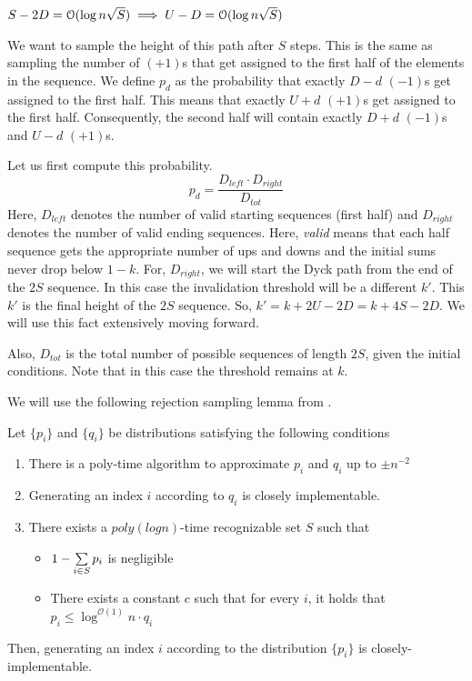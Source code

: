 \begin{lemma}
$S-2D = \Bo(\log n\sqrt S) \implies U-D = \Bo(\log n\sqrt S)$
\label{lem:dyck_var0}
\end{lemma}

We want to sample the height of this path after $S$ steps.
This is the same as sampling the number of $(+1)$s that get assigned to the first half of the elements in the sequence.
We define $p_d$ as the probability that exactly $D-d$ $(-1)$s get assigned to the first half.
This means that exactly $U+d$ $(+1)$s get assigned to the first half.
Consequently, the second half will contain exactly $D+d$ $(-1)$s and $U-d$ $(+1)$s.


Let us first compute this probability.
$$
p_d = \frac{D_{left}\cdot D_{right}}{D_{tot}}
$$
Here, $D_{left}$ denotes the number of valid starting sequences (first half)
and $D_{right}$ denotes the number of valid ending sequences.
Here, \textit{valid} means that each half sequence gets the appropriate number of ups and downs
and the initial sums never drop below $1-k$.
For, $D_{right}$, we will start the Dyck path from the end of the $2S$ sequence.
In this case the invalidation threshold will be a different $k'$.
This $k'$ is the final height of the $2S$ sequence. So, $k'=k+2U-2D = k+4S-2D$.
We will use this fact extensively moving forward.

Also, $D_{tot}$ is the total number of possible sequences of length $2S$, given the initial conditions.
Note that in this case the threshold remains at $k$.

We will use the following rejection sampling lemma from \cite{huge}.
\begin{lemma}
\label{lem:huge}
Let $\{p_i\}$ and $\{q_i\}$ be distributions satisfying the following conditions
\begin{enumerate}
    \item There is a poly-time algorithm to approximate $p_i$ and $q_i$ up to $\pm n^{-2}$
    \item Generating an index $i$ according to $q_i$ is closely implementable.
    \item There exists a $poly(log n)$-time recognizable set $S$ such that
    \begin{itemize}
        \item $1-\sum\limits_{i\in S}^{} p_i$ is negligible
        \item There exists a constant $c$ such that for every $i$, it holds that $p_i\le \log^{\mathcal{O}(1)} n\cdot q_i$
    \end{itemize}
\end{enumerate}
Then, generating an index $i$ according to the distribution $\{p_i\}$ is closely-implementable.
\end{lemma}

